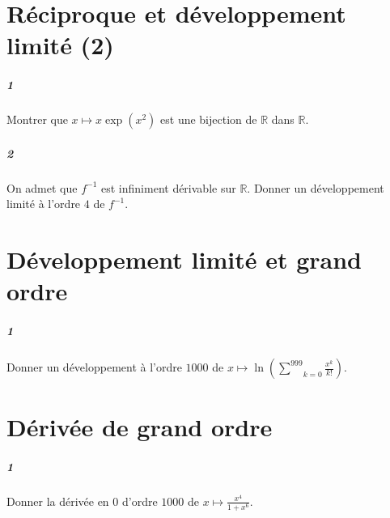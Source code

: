 \documentclass[10pt,a4paper]{article}
\newcommand{\summ}[2]{\underset{#1}{\overset{#2}{\sum}}}
\begin{document}
\section{Réciproque et développement limité (2)}
\subparagraph{1}Montrer que $x \mapsto x\exp(x^2)$ est une bijection de $\mathbb{R}$ dans $\mathbb{R}$.
\subparagraph{2}On admet que $f^{-1}$ est infiniment dérivable sur $\mathbb{R}$. Donner un développement limité à l'ordre $4$ de $f^{-1}$.

\section{Développement limité et grand ordre}
\subparagraph{1}Donner un développement à l'ordre $1000$ de $x \mapsto \ln(\summ{k=0}{999} \frac{x^k}{k!})$.

\section{Dérivée de grand ordre}
\subparagraph{1}Donner la dérivée en 0 d'ordre $1000$ de $x \mapsto \frac{x^4}{1+x^6}$.
\end{document}

